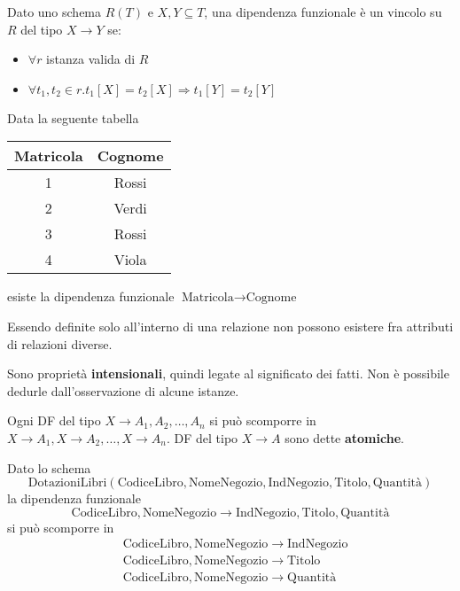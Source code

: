 \begin{definition}
	Dato uno schema $R(T)$ e $X, Y \subseteq T$, una dipendenza funzionale è un vincolo su $R$ del tipo $X \to Y$ se:
	\begin{itemize}
		\item $\forall r$ istanza valida di $R$
		\item $\forall t_1, t_2 \in r . t_1[X] = t_2[X] \Rightarrow t_1[Y]=t_2[Y]$
	\end{itemize}
\end{definition}
\newpage
\begin{example}
	Data la seguente tabella
	\begin{table}[!h]
		\centering
		\begin{tabular}{|c|c|}
			\hline
			\textbf{Matricola} & \textbf{Cognome}\\
			\hline
			1 & Rossi \\
			\hline
			2 & Verdi \\
			\hline
			3 & Rossi \\
			\hline
			4 & Viola \\
			\hline
		\end{tabular}
	\end{table}
	esiste la dipendenza funzionale $\text{Matricola} \to \text{Cognome}$
\end{example}

\begin{note}
	Essendo definite solo all'interno di una relazione non possono esistere fra attributi di relazioni diverse.
\end{note}
\begin{note}
	Sono proprietà \textbf{intensionali}, quindi legate al significato dei fatti. Non è possibile dedurle dall'osservazione di alcune istanze.
\end{note}

\begin{definition}
	Ogni DF del tipo $X \to A_1, A_2, \ldots, A_n$ si può scomporre in $X\to A_1, X \to A_2, \ldots, X\to A_n$. DF del tipo $X \to A$ sono dette \textbf{atomiche}.
\end{definition}

\begin{example}
	Dato lo schema
	\begin{equation*}
		\text{DotazioniLibri}(\text{CodiceLibro}, \text{NomeNegozio}, \text{IndNegozio}, \text{Titolo}, \text{Quantità})
	\end{equation*}
	la dipendenza funzionale
	\begin{equation*}
		\text{CodiceLibro}, \text{NomeNegozio}\to \text{IndNegozio}, \text{Titolo}, \text{Quantità}
	\end{equation*}
	si può scomporre in
	\begin{align*}
		& \text{CodiceLibro}, \text{NomeNegozio}\to \text{IndNegozio} \\
		& \text{CodiceLibro}, \text{NomeNegozio}\to \text{Titolo}\\
		& \text{CodiceLibro}, \text{NomeNegozio}\to \text{Quantità}
	\end{align*}
\end{example}

